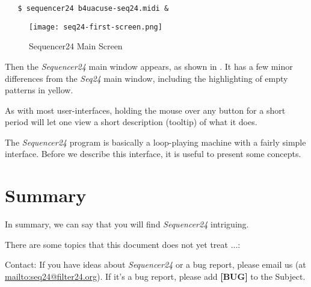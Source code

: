 \documentclass[
 11pt,
 twoside,
 a4paper,
 headinclude,
 footinclude,
 final                                 %
]{article}
\begin{document}

\begin{verbatim}
   $ sequencer24 b4uacuse-seq24.midi &
\end{verbatim}

\begin{figure}[H]
   \centering 
   \texttt{[image: seq24-first-screen.png]}
   \caption{Sequencer24 Main Screen}
   \label{fig:seq24_main_screen}
\end{figure}

   Then the \textsl{Sequencer24} main window appears, as shown in
   .  It has a few minor differences
   from the \textsl{Seq24} main window, including the highlighting of
   empty patterns in yellow.

   As with most user-interfaces, holding the mouse over any button for a
   short period will let one view a short description (tooltip)
   of what it does.

   The \textsl{Sequencer24} program is basically a loop-playing machine with a 
   fairly simple interface.  Before we describe this interface, it is useful
   to present some concepts.



























% 

\section{Summary}
\label{sec:summary}

   In summary, we can say that you will find \textsl{Sequencer24} intriguing.

   There are some topics that this document does not yet treat ...:

   Contact: If you have ideas about \textsl{Sequencer24} or a bug report, please
   email us (at \url{mailto:seq24@filter24.org}).
   If it's a bug report, please add \textbf{[BUG]} to the Subject.




\printindex
\end{document}
